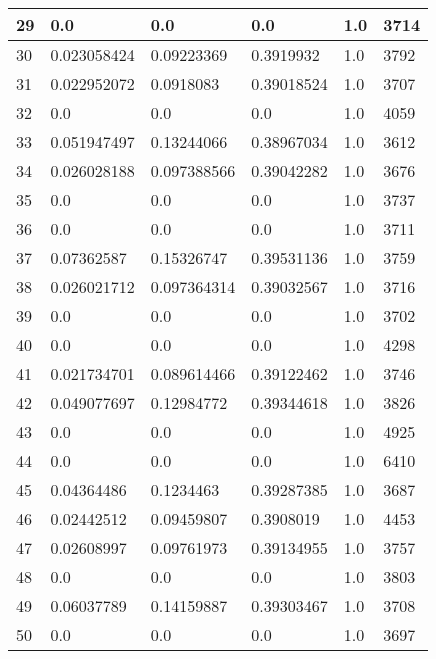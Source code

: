 \begin{longtable}{|l|l|l|l|l|l|}
29 & 0.0 & 0.0 & 0.0 & 1.0 & 3714 \\ \hline 
30 & 0.023058424 & 0.09223369 & 0.3919932 & 1.0 & 3792 \\ \hline 
31 & 0.022952072 & 0.0918083 & 0.39018524 & 1.0 & 3707 \\ \hline 
32 & 0.0 & 0.0 & 0.0 & 1.0 & 4059 \\ \hline 
33 & 0.051947497 & 0.13244066 & 0.38967034 & 1.0 & 3612 \\ \hline 
34 & 0.026028188 & 0.097388566 & 0.39042282 & 1.0 & 3676 \\ \hline 
35 & 0.0 & 0.0 & 0.0 & 1.0 & 3737 \\ \hline 
36 & 0.0 & 0.0 & 0.0 & 1.0 & 3711 \\ \hline 
37 & 0.07362587 & 0.15326747 & 0.39531136 & 1.0 & 3759 \\ \hline 
38 & 0.026021712 & 0.097364314 & 0.39032567 & 1.0 & 3716 \\ \hline 
39 & 0.0 & 0.0 & 0.0 & 1.0 & 3702 \\ \hline 
40 & 0.0 & 0.0 & 0.0 & 1.0 & 4298 \\ \hline 
41 & 0.021734701 & 0.089614466 & 0.39122462 & 1.0 & 3746 \\ \hline 
42 & 0.049077697 & 0.12984772 & 0.39344618 & 1.0 & 3826 \\ \hline 
43 & 0.0 & 0.0 & 0.0 & 1.0 & 4925 \\ \hline 
44 & 0.0 & 0.0 & 0.0 & 1.0 & 6410 \\ \hline 
45 & 0.04364486 & 0.1234463 & 0.39287385 & 1.0 & 3687 \\ \hline 
46 & 0.02442512 & 0.09459807 & 0.3908019 & 1.0 & 4453 \\ \hline 
47 & 0.02608997 & 0.09761973 & 0.39134955 & 1.0 & 3757 \\ \hline 
48 & 0.0 & 0.0 & 0.0 & 1.0 & 3803 \\ \hline 
49 & 0.06037789 & 0.14159887 & 0.39303467 & 1.0 & 3708 \\ \hline 
50 & 0.0 & 0.0 & 0.0 & 1.0 & 3697 \\ \hline 
\end{longtable}